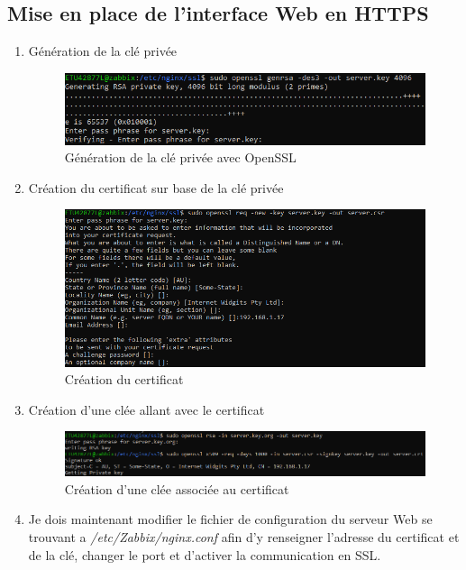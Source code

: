 \documentclass[a4paper]{article}
\begin{document}
\subsection{Mise en place de l'interface Web en HTTPS}
\begin{enumerate}
  \item Génération de la clé privée
  \begin{figure}[H]
    \centering
    \includegraphics[width=12cm]{images/Rapport/zabbix/1.png}
    \caption{Génération de la clé privée avec OpenSSL}
  \end{figure}
  \item Création du certificat sur base de la clé privée
  \begin{figure}[H]
    \centering
    \includegraphics[width=13cm]{images/Rapport/zabbix/yoo.png}
    \caption{Création du certificat}
  \end{figure}
  \item Création d'une clée allant avec le certificat
  \begin{figure}[H]
    \centering
    \includegraphics[width=12cm]{images/Rapport/zabbix/2.png}
    \caption{Création d'une clée associée au certificat}
  \end{figure}
  \item Je dois maintenant modifier le fichier de configuration du serveur Web se trouvant a \emph{/etc/Zabbix/nginx.conf} afin d'y renseigner l'adresse du certificat et de la clé, changer le port et d'activer la communication en SSL.
  \begin{figure}[H]

\end{figure}
\end{enumerate}
\end{document}
